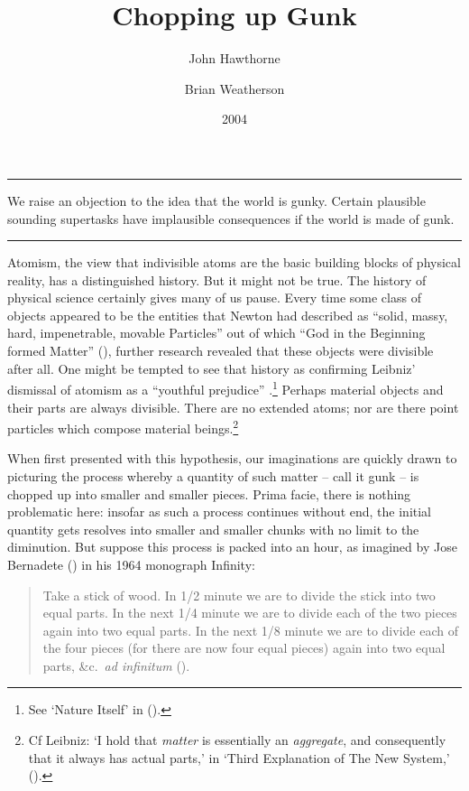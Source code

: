\documentclass[
  10pt,
  letterpaper,
  DIV=11,
  numbers=noendperiod,
  twoside]{scrartcl}
\title{Chopping up Gunk}
\author{John Hawthorne \and Brian Weatherson}
\date{2004}
\renewenvironment{abstract}
 {\vspace{-1.25cm}
 \quotation\small\noindent\rule{\linewidth}{.5pt}\par\smallskip
 \noindent }
 {\par\noindent\rule{\linewidth}{.5pt}\endquotation}
\begin{document}
\maketitle
\begin{abstract}
We raise an objection to the idea that the world is gunky. Certain
plausible sounding supertasks have implausible consequences if the world
is made of gunk.
\end{abstract}


Atomism, the view that indivisible atoms are the basic building blocks
of physical reality, has a distinguished history. But it might not be
true. The history of physical science certainly gives many of us pause.
Every time some class of objects appeared to be the entities that Newton
had described as ``solid, massy, hard, impenetrable, movable Particles''
out of which ``God in the Beginning formed Matter''
(), further research revealed
that these objects were divisible after all. One might be tempted to see
that history as confirming Leibniz' dismissal of atomism as a ``youthful
prejudice'' .\footnote{See `Nature Itself' in
  ().} Perhaps material
objects and their parts are always divisible. There are no extended
atoms; nor are there point particles which compose material
beings.\footnote{Cf Leibniz: `I hold that \emph{matter} is essentially
  an \emph{aggregate}, and consequently that it always has actual
  parts,' in `Third Explanation of The New System,'
  ().}

When first presented with this hypothesis, our imaginations are quickly
drawn to picturing the process whereby a quantity of such matter -- call
it gunk -- is chopped up into smaller and smaller pieces. Prima facie,
there is nothing problematic here: insofar as such a process continues
without end, the initial quantity gets resolves into smaller and smaller
chunks with no limit to the diminution. But suppose this process is
packed into an hour, as imagined by Jose Bernadete
() in his 1964 monograph Infinity:

\begin{quote}
Take a stick of wood. In 1/2 minute we are to divide the stick into two
equal parts. In the next 1/4 minute we are to divide each of the two
pieces again into two equal parts. In the next 1/8 minute we are to
divide each of the four pieces (for there are now four equal pieces)
again into two equal parts, \&c.~\emph{ad infinitum}
().
\end{quote}
\end{document}
